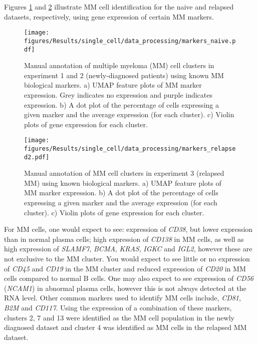 Figures \ref{fig:mm_markers_naive} and \ref{fig:mm_markers_relapsed} illustrate MM cell identification for the naive and relapsed datasets, respectively, using gene expression of certain MM markers.
\begin{figure}[p]
    \centering
    \texttt{[image: figures/Results/single\_cell/data\_processing/markers\_naive.pdf]}
    \caption[MM cluster manual annotation- newly diagnosed MM]{Manual annotation of multiple myeloma (MM) cell clusters in experiment 1 and 2 (newly-diagnosed patients) using known MM biological markers.
    a) UMAP feature plots of MM marker expression.
    Grey indicates no expression and purple indicates expression.
    b) A dot plot of the percentage of cells expressing a given marker and the average expression (for each cluster).
    c) Violin plots of gene expression for each cluster.}
    \label{fig:mm_markers_naive}
\end{figure}
%
\begin{figure}[p]
    \centering
    \texttt{[image: figures/Results/single\_cell/data\_processing/markers\_relapsed2.pdf]}
    \caption[MM cluster manual annotation- relapsed MM]{Manual annotation of MM cell clusters in experiment 3 (relapsed MM) using known biological markers.
    a) UMAP feature plots of MM marker expression.
    b) A dot plot of the percentage of cells expressing a given marker and the average expression (for each cluster).
    c) Violin plots of gene expression for each cluster. }
    \label{fig:mm_markers_relapsed}
\end{figure}
%
For MM cells, one would expect to see: expression of \textit{CD38}, but lower expression than in normal plasma cells;
high expression of \textit{CD138} in MM cells, as well as high expression of \textit{SLAMF7}, \textit{BCMA}, \textit{KRAS}, \textit{IGKC} and \textit{IGL2}, however these are not exclusive to the MM cluster.
You would expect to see little or no expression of \textit{CD45} and \textit{CD19} in the MM cluster and reduced expression of \textit{CD20} in MM cells compared to normal B cells.
One may also expect to see expression of \textit{CD56} (\textit{NCAM1}) in abnormal plasma cells, however this is not always detected at the RNA level.
Other common markers used to identify MM cells include, \textit{CD81}, \textit{B2M} and \textit{CD117}.
Using the expression of a combination of these markers, clusters 2, 7 and 13 were identified as the MM cell population in the newly diagnosed dataset and cluster 4 was identified as MM cells in the relapsed MM dataset.

